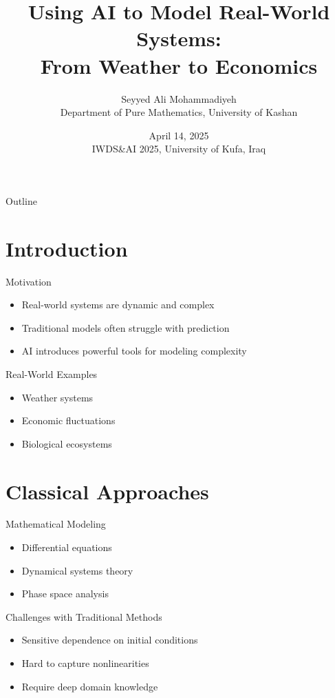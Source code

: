 \documentclass[xcolor=table]{beamer}
\title{Using AI to Model Real-World Systems:\\From Weather to Economics}
\author{Seyyed Ali Mohammadiyeh\\\small Department of Pure Mathematics, University of Kashan}
\date{April 14, 2025\\\small IWDS\&AI 2025, University of Kufa, Iraq}
\begin{document}
\begin{frame}
    \titlepage
\end{frame}

\begin{frame}{Outline}
    \tableofcontents
\end{frame}

\section{Introduction}

\begin{frame}{Motivation}
    \begin{itemize}
        \item Real-world systems are dynamic and complex
        \item Traditional models often struggle with prediction
        \item AI introduces powerful tools for modeling complexity
    \end{itemize}
\end{frame}

\begin{frame}{Real-World Examples}
    \begin{itemize}
        \item Weather systems
        \item Economic fluctuations
        \item Biological ecosystems
    \end{itemize}
\end{frame}

\section{Classical Approaches}

\begin{frame}{Mathematical Modeling}
    \begin{itemize}
        \item Differential equations
        \item Dynamical systems theory
        \item Phase space analysis
    \end{itemize}
\end{frame}

\begin{frame}{Challenges with Traditional Methods}
    \begin{itemize}
        \item Sensitive dependence on initial conditions
        \item Hard to capture nonlinearities
        \item Require deep domain knowledge
    \end{itemize}
\end{frame}
\end{document}
